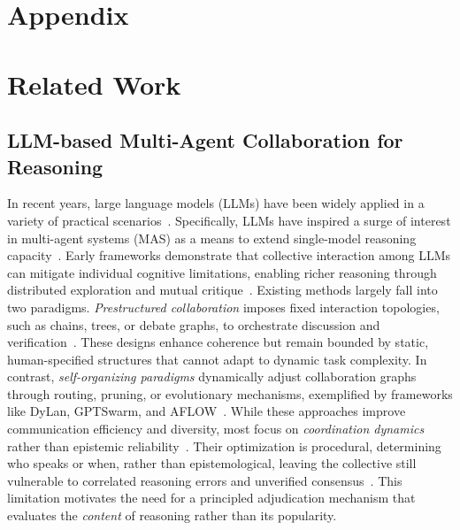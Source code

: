 \documentclass{article}
\theoremstyle{plain}
\theoremstyle{definition}
\theoremstyle{remark}
\begin{document}



\newpage
\appendix
\onecolumn
\section*{Appendix}


\section{Related Work}
\label{app:app_relatedwork}

\subsection{LLM-based Multi-Agent Collaboration for Reasoning}
\label{app:relatedwork_part1}
In recent years, large language models (LLMs) have been widely applied in a variety of practical scenarios~\cite{chen2025tourrank,xia2025hierarchical,zhao2025hierarchical,yang2024enhancing}. Specifically, LLMs have inspired a surge of interest in multi-agent systems (MAS) as a means to extend single-model reasoning capacity~\cite{wu2024autogen,motwani2024malt,ishibashi2024self,yan2025beyond,dai2025multi}. Early frameworks demonstrate that collective interaction among LLMs can mitigate individual cognitive limitations, enabling richer reasoning through distributed exploration and mutual critique~\cite{hong2023metagpt,chen2023agentverse,jiang2023llm,ning2023skeleton,qiao2024autoact,pan2024agentcoord}.  
Existing methods largely fall into two paradigms. \emph{Prestructured collaboration} imposes fixed interaction topologies, such as chains, trees, or debate graphs, to orchestrate discussion and verification~\cite{du2023improving,liu2024groupdebate,qian2024scaling}. These designs enhance coherence but remain bounded by static, human-specified structures that cannot adapt to dynamic task complexity. In contrast, \emph{self-organizing paradigms} dynamically adjust collaboration graphs through routing, pruning, or evolutionary mechanisms, exemplified by frameworks like DyLan, GPTSwarm, and AFLOW~\cite{hu2024automated,shang2024agentsquare,zhang2024cut,zhuge2024gptswarm,zhang2024aflow}.  
While these approaches improve communication efficiency and diversity, most focus on \textit{coordination dynamics} rather than epistemic reliability~\citep{wan2025rema,peiyuan2024agile,feng2024large}. Their optimization is procedural, determining who speaks or when, rather than epistemological, leaving the collective still vulnerable to correlated reasoning errors and unverified consensus~\citep{chen2022ptde,wei2025lero,jiang2025qllm,alsadat2024multi,lin2025speaking}. This limitation motivates the need for a principled adjudication mechanism that evaluates the \textit{content} of reasoning rather than its popularity.
\end{document}
